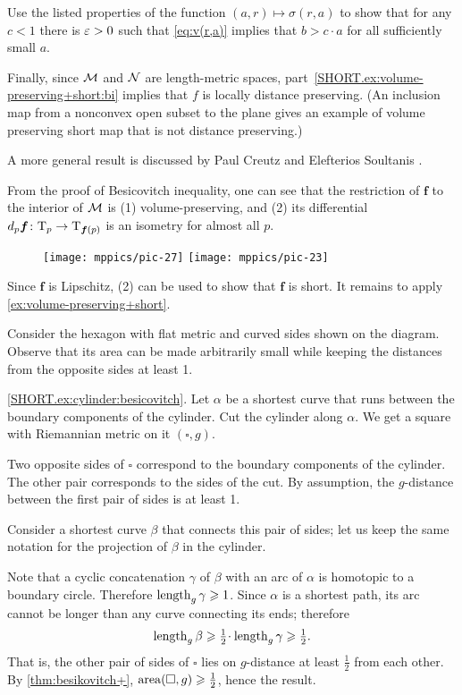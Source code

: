 Use the listed properties of the function $(a,r)\mapsto \sigma(r,a)$ to show that for any $c<1$ there is $\varepsilon>0$ such that \ref{eq:v(r,a)} implies that $b>c\cdot a$ for all sufficiently small $a$.

Finally, since $\mathcal{M}$ and  $\mathcal{N}$ are length-metric spaces, part~\ref{SHORT.ex:volume-preserving+short:bi} implies that $f$ is locally distance preserving.
(An inclusion map from a nonconvex open subset to the plane gives an example of volume preserving short map that is not distance preserving.)


\medskip

A more general result is discussed by Paul Creutz and Elefterios Soultanis \cite{creutz-soultanis}.


From the proof of Besicovitch inequality, one can see that the restriction of $\bm{f}$ to the interior of $\mathcal{M}$ is
(1) volume-preserving, and 
(2) its differential $d_p\bm{f}\colon\mathrm{T}_p\to \mathrm{T}_{\bm{f}(p)}$ is an isometry for almost all $p$.

\begin{wrapfigure}{r}{45 mm}
\vskip-4mm
\centering
\texttt{[image: mppics/pic-27]}
\bigskip
\texttt{[image: mppics/pic-23]}
\end{wrapfigure}

Since $\bm{f}$ is Lipschitz, (2) can be used to show that $\bm{f}$ is short.
It remains to apply \ref{ex:volume-preserving+short}.

Consider the hexagon with flat metric and curved sides shown on the diagram.
Observe that its area can be made arbitrarily small while keeping the distances from the opposite sides at least 1.

\parbf{\ref{ex:cylinder};} \ref{SHORT.ex:cylinder:besicovitch}.
Let $\alpha$ be a shortest curve that runs between the boundary components of the cylinder.
Cut the cylinder along $\alpha$.
We get a square with Riemannian metric on it $(\square,g)$.

Two opposite sides of $\square$ correspond to the boundary components of the cylinder.
The other pair corresponds to the sides of the cut.
By assumption, the $g$-distance between the first pair of sides is at least 1.

Consider a shortest curve $\beta$ that connects this pair of sides;
let us keep the same notation for the projection of $\beta$ in the cylinder.

Note that a cyclic concatenation $\gamma$ of $\beta$ with an arc of $\alpha$ is homotopic to a boundary circle.
Therefore $\mathop{\rm length}\nolimits_g\gamma\geqslant1$.
Since $\alpha$ is a shortest path, its arc cannot be longer than any curve connecting its ends; therefore 
\[\length_g\beta\ge \tfrac 12\cdot\length_g \gamma\ge \tfrac 12.\]
That is, the other pair of sides of $\square$ lies on $g$-distance at least $\tfrac12$ from each other.
By \ref{thm:besikovitch+}, $\operatorname{\rm area}\nolimits(\square,g)\geqslant \tfrac12$, hence the result.

